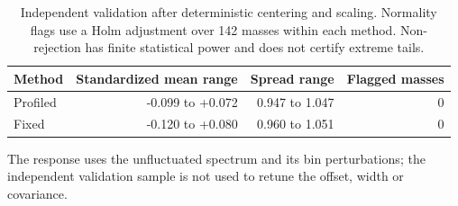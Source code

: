 \begin{table}[H]\centering\small
\begin{tabular}{lrrr}\toprule
Method & Standardized mean range & Spread range & Flagged masses\\\midrule
Profiled & -0.099 to +0.072 & 0.947 to 1.047 & 0 \\
Fixed & -0.120 to +0.080 & 0.960 to 1.051 & 0 \\
\bottomrule\end{tabular}
\caption{Independent validation after deterministic centering and scaling. Normality flags use a Holm adjustment over 142 masses within each method. Non-rejection has finite statistical power and does not certify extreme tails.}\end{table}
The response uses the unfluctuated spectrum and its bin perturbations; the independent validation sample is not used to retune the offset, width or covariance.
